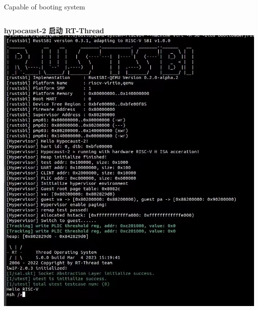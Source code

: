 \documentclass{beamer}
\begin{document}
  \begin{frame}{Capable of booting system}
      \begin{columns}
          \begin{column}{0.5\textwidth}
            \centering
            \textbf{hypocaust-2 启动 RT-Thread}
            \includegraphics[width=\linewidth]{pic/hypocaust-2-rt-thread.jpeg}          
        \end{column}


\end{columns}
\end{frame}
\end{document}
